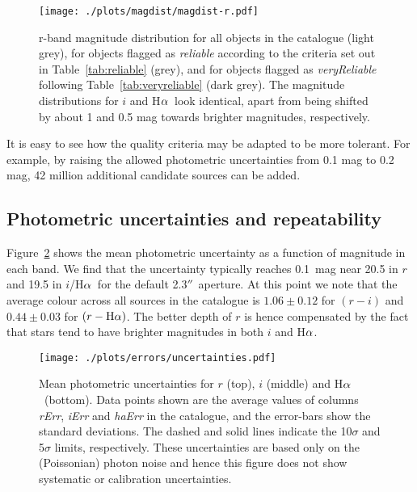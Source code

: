 \documentclass[useAMS,usenatbib]{mn2e}
\def\ha{\mbox{H$\rm \alpha$}}
\def\arcsec{$''$}
\begin{document}
\begin{figure}
    \texttt{[image: ./plots/magdist/magdist-r.pdf]} 
    \caption{r-band magnitude distribution for all objects in the catalogue 
    (light grey), for objects flagged as \emph{reliable} 
    according to the criteria set out in Table~\ref{tab:reliable} (grey),
    and for objects flagged as \emph{veryReliable} 
    following Table~\ref{tab:veryreliable} (dark grey).
    The magnitude distributions for $i$ and \ha\
    look identical, apart from being shifted
    by about 1 and 0.5 mag towards brighter magnitudes,
    respectively.}
    \label{fig:magdist}
\end{figure}

It is easy to see how the quality criteria
may be adapted to be more tolerant.
For example, by raising the allowed photometric uncertainties
from 0.1 mag to 0.2 mag, 42 million additional candidate sources can be added.

\subsection{Photometric uncertainties and repeatability}

Figure~\ref{fig:uncertainties} shows the mean photometric
uncertainty as a function of magnitude in each band.
We find that the uncertainty typically
reaches 0.1~mag near 20.5 in $r$ 
and 19.5 in $i$/\ha\ for the default 2.3\arcsec\ aperture.
At this point we note that the average colour
across all sources in the catalogue is
$1.06\pm0.12$ for $(r-i)$ and $0.44\pm0.03$ for $(r-\ha)$.
The better depth of $r$ is hence compensated
by the fact that stars tend to have 
brighter magnitudes in both $i$ and \ha.

\begin{figure}
    \texttt{[image: ./plots/errors/uncertainties.pdf]} 
    \caption{Mean photometric uncertainties
             for $r$ (top), $i$ (middle) and \ha\ (bottom).
             Data points shown are the average values of
             columns \emph{rErr}, \emph{iErr} and \emph{haErr}
             in the catalogue, 
             and the error-bars show the standard deviations.
             The dashed and solid lines indicate 
             the 10$\sigma$ and 5$\sigma$ limits, respectively.
             These uncertainties are based only on the (Poissonian)
             photon noise and hence this figure does not show
             systematic or calibration uncertainties.}
    \label{fig:uncertainties}
\end{figure}
\end{document}
